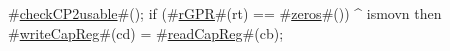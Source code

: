 #\hyperref[sailMIPSzcheckCP2usable]{checkCP2usable}#();
if (#\hyperref[sailMIPSzrGPR]{rGPR}#(rt) == #\hyperref[sailMIPSzzzeros]{zeros}#()) ^ ismovn then
  #\hyperref[sailMIPSzwriteCapReg]{writeCapReg}#(cd) = #\hyperref[sailMIPSzreadCapReg]{readCapReg}#(cb);
